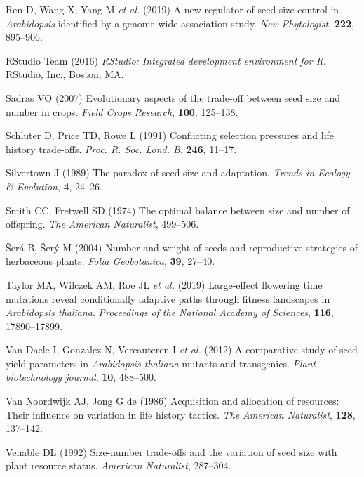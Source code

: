 \documentclass[
]{article}
\begin{document}
\leavevmode\hypertarget{ref-ren2019new}{}%
Ren D, Wang X, Yang M \emph{et al.} (2019) A new regulator of seed size control in \emph{Arabidopsis} identified by a genome-wide association study. \emph{New Phytologist}, \textbf{222}, 895--906.

\leavevmode\hypertarget{ref-RStudioTeam2015}{}%
RStudio Team (2016) \emph{RStudio: Integrated development environment for R}. RStudio, Inc., Boston, MA.

\leavevmode\hypertarget{ref-Sadras2007}{}%
Sadras VO (2007) Evolutionary aspects of the trade-off between seed size and number in crops. \emph{Field Crops Research}, \textbf{100}, 125--138.

\leavevmode\hypertarget{ref-schluter1991conflicting}{}%
Schluter D, Price TD, Rowe L (1991) Conflicting selection pressures and life history trade-offs. \emph{Proc. R. Soc. Lond. B}, \textbf{246}, 11--17.

\leavevmode\hypertarget{ref-Silvertown1989}{}%
Silvertown J (1989) The paradox of seed size and adaptation. \emph{Trends in Ecology \& Evolution}, \textbf{4}, 24--26.

\leavevmode\hypertarget{ref-Smith1974}{}%
Smith CC, Fretwell SD (1974) The optimal balance between size and number of offspring. \emph{The American Naturalist}, 499--506.

\leavevmode\hypertarget{ref-Sera2004}{}%
Šerá B, Šerý M (2004) Number and weight of seeds and reproductive strategies of herbaceous plants. \emph{Folia Geobotanica}, \textbf{39}, 27--40.

\leavevmode\hypertarget{ref-taylor2019large}{}%
Taylor MA, Wilczek AM, Roe JL \emph{et al.} (2019) Large-effect flowering time mutations reveal conditionally adaptive paths through fitness landscapes in \emph{Arabidopsis thaliana}. \emph{Proceedings of the National Academy of Sciences}, \textbf{116}, 17890--17899.

\leavevmode\hypertarget{ref-van2012comparative}{}%
Van Daele I, Gonzalez N, Vercauteren I \emph{et al.} (2012) A comparative study of seed yield parameters in \emph{Arabidopsis thaliana} mutants and transgenics. \emph{Plant biotechnology journal}, \textbf{10}, 488--500.

\leavevmode\hypertarget{ref-VanNoordwijk1986}{}%
Van Noordwijk AJ, Jong G de (1986) Acquisition and allocation of resources: Their influence on variation in life history tactics. \emph{The American Naturalist}, \textbf{128}, 137--142.

\leavevmode\hypertarget{ref-Venable1992}{}%
Venable DL (1992) Size-number trade-offs and the variation of seed size with plant resource status. \emph{American Naturalist}, 287--304.
\end{document}
